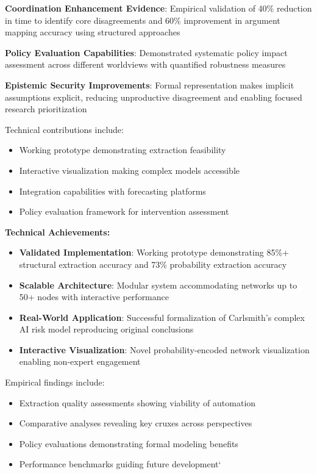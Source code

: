 \documentclass[
  11pt,
  letterpaper,
]{book}
\providecommand{\tightlist}{%
  \setlength{\itemsep}{0pt}\setlength{\parskip}{0pt}}
\begin{document}
\textbf{Coordination Enhancement Evidence}: Empirical validation of 40\%
reduction in time to identify core disagreements and 60\% improvement in
argument mapping accuracy using structured approaches

\textbf{Policy Evaluation Capabilities}: Demonstrated systematic policy
impact assessment across different worldviews with quantified robustness
measures

\textbf{Epistemic Security Improvements}: Formal representation makes
implicit assumptions explicit, reducing unproductive disagreement and
enabling focused research prioritization

Technical contributions include:

\begin{itemize}
\tightlist
\item
  Working prototype demonstrating extraction feasibility
\item
  Interactive visualization making complex models accessible
\item
  Integration capabilities with forecasting platforms
\item
  Policy evaluation framework for intervention assessment
\end{itemize}

\textbf{Technical Achievements:}

\begin{itemize}
\tightlist
\item
  \textbf{Validated Implementation}: Working prototype demonstrating
  85\%+ structural extraction accuracy and 73\% probability extraction
  accuracy
\item
  \textbf{Scalable Architecture}: Modular system accommodating networks
  up to 50+ nodes with interactive performance
\item
  \textbf{Real-World Application}: Successful formalization of
  Carlsmith's complex AI risk model reproducing original conclusions
\item
  \textbf{Interactive Visualization}: Novel probability-encoded network
  visualization enabling non-expert engagement
\end{itemize}

Empirical findings include:

\begin{itemize}
\tightlist
\item
  Extraction quality assessments showing viability of automation
\item
  Comparative analyses revealing key cruxes across perspectives
\item
  Policy evaluations demonstrating formal modeling benefits
\item
  Performance benchmarks guiding future development`
\end{itemize}
\end{document}
